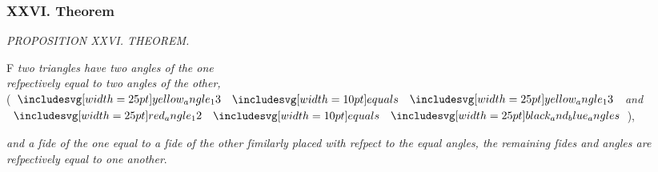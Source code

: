 \documentclass[12pt,preview]{standalone}
\begin{document}
\subsubsection{XXVI. Theorem}

\begin{minipage}{0.33\textwidth}
    \phantom{}
\end{minipage}%
\hfill
\begin{minipage}[t]{0.64\textwidth}

    \begin{center}
        \textit{PROPOSITION XXVI. THEOREM.}\label{book1pr26} \\
    \end{center}

    \hfill

    \begin{center}
        \raggedright \lettrine[lines=4, loversize=1, nindent=0pt]{}{}F \textit{two triangles have two angles of the one\\ reſpectively equal to two angles of the other,}\\ (\hspace{-1ex}$\img{yellow_angle_13} \bequals \img{yellow_angle_13}$ \textit{and} $\img{red_angle_12} \bequals \img{black_and_blue_angles}$\hspace{-1ex}),\\
    \end{center}
    \vspace{1ex}
    \textit{and a ſide of the one equal to a ſide of the other ſimilarly placed with reſpect to the equal angles, the remaining ſides and angles are reſpectively equal to one another}.

\end{minipage}%

\hfill
\end{document}
